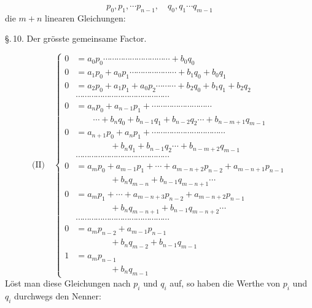 \[
p_0, p_1, \cdots p_{n-1}, \quad q_0, q_1 \cdots q_{m-1}
\]
die $m+n$ linearen Gleichungen:


\S.\,10. Der grösste gemeinsame Factor.

\[
\text{(II)}\quad
\left\{
\begin{aligned}
0 &= a_0 p_0 \cdots\cdots\cdots\cdots\cdots\cdots\cdots\cdots\cdots\cdots + b_0 q_0\\
0 &= a_1 p_0 + a_0 p_1 \cdots\cdots\cdots\cdots\cdots\cdots\cdots + b_1 q_0 + b_0 q_1\\
0 &= a_2 p_0 + a_1 p_1 + a_0 p_2 \cdots\cdots\cdots + b_2 q_0 + b_1 q_1 + b_2 q_2\\
&\cdots\cdots\cdots\cdots\cdots\cdots\cdots\cdots\cdots\cdots\cdots\cdots\cdots\cdots\\
0 &= a_n p_0 + a_{n-1} p_1 + \cdots\cdots\cdots\cdots\cdots\cdots\cdots\cdots\cdots\\
&\qquad\cdots + b_n q_0 + b_{n-1} q_1 + b_{n-2} q_2\cdots + b_{n-m+1} q_{m-1}\\
0 &= a_{n+1} p_0 + a_n p_1 + \cdots\cdots\cdots\cdots\cdots\cdots\cdots\cdots\cdots\cdots\cdots\\
&\qquad\qquad + b_n q_1 + b_{n-1} q_2 \cdots + b_{n-m+2} q_{m-1}\\
&\cdots\cdots\cdots\cdots\cdots\cdots\cdots\cdots\cdots\cdots\cdots\cdots\cdots\cdots\\
0 &= a_m p_0 + a_{m-1} p_1 + \cdots + a_{m-n+2} p_{n-2} + a_{m-n+1} p_{n-1}\\
&\qquad\qquad + b_n q_{m-n} + b_{n-1} q_{m-n+1}\cdots\\
0 &= a_m p_1 + \cdots + a_{m-n+3} p_{n-2} + a_{m-n+2} p_{n-1}\\
&\qquad\qquad + b_n q_{m-n+1} + b_{n-1} q_{m-n+2}\cdots\\
&\cdots\cdots\cdots\cdots\cdots\cdots\cdots\cdots\cdots\cdots\cdots\cdots\cdots\cdots\\
0 &= a_m p_{n-2} + a_{m-1} p_{n-1}\\
&\qquad\qquad + b_n q_{m-2} + b_{n-1} q_{m-1}\\
1 &= a_m p_{n-1}\\
&\qquad\qquad + b_n q_{m-1}
\end{aligned}
\right.
\]
Löst man diese Gleichungen nach $p_i$ und $q_i$ auf, so haben die Werthe
von $p_i$ und $q_i$ durchwegs den Nenner:


